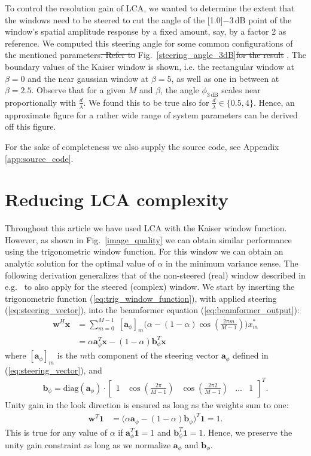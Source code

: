 \documentclass[10pt,journal,draftclsnofoot,onecolumn]{IEEEtran}
\newcommand\Fig[1]{Fig.~\ref{#1}}
\newcommand\nn{\nonumber\\}
\newcommand\sumb[2]{\sum\limits_{#1}^{#2}\;}
\newcommand\T{^{\scriptscriptstyle T}}
\renewcommand\H{^{\scriptscriptstyle H}}
\renewcommand\vec[1]{\boldsymbol{#1}}
\newcommand\1{\vec 1}
\renewcommand*\a{\vec a}
\newcommand*\w{\vec w}
\newcommand*\x{\vec x}
\newcommand\minus{\scalebox{0.75}[1.0]{$-$}}
\providecommand{\DIFadd}[1]{{\protect\color{blue}\uwave{#1}}} %
\providecommand{\DIFdel}[1]{{\protect\color{red}\sout{#1}}}                      %
\providecommand{\DIFaddbegin}{} %
\providecommand{\DIFaddend}{} %
\providecommand{\DIFdelbegin}{} %
\providecommand{\DIFdelend}{} %
\begin{document}
To control the resolution gain of LCA, we wanted to determine the extent that the windows need to be steered to cut the angle of the \minus{}3\,dB point of the window's spatial amplitude response by a fixed amount, say, by a factor 2 as reference. We computed this steering angle for some common configurations of the mentioned parameters\DIFdelbegin \DIFdel{. Refer to }\DIFdelend \DIFaddbegin \DIFadd{, see the result in }\DIFaddend \Fig{steering_angle_3dB}\DIFdelbegin \DIFdel{for the result }\DIFdelend . The boundary values of the Kaiser window is shown, i.e. the rectangular window at $\beta=0$ and the near gaussian window at $\beta=5$, as well as one in between at $\beta=2.5$. Observe that for a given $M$ and $\beta$, the angle $\phi_\mathrm{3\,dB}$ scales near proportionally with $\frac{d}{\lambda}$. We found this to be true also for $\frac{d}{\lambda}\in\{0.5,4\}$. Hence, an approximate figure for a rather wide range of system parameters can be derived off this figure.

For the sake of completeness we also supply the source code, see Appendix \ref{app:source_code}.


\section{Reducing LCA complexity}\label{sec:reducing_lca_complexity}

\renewcommand\b{\vec b}

Throughout this article we have used LCA with the Kaiser window function. However, as shown in \Fig{image_quality} we can obtain similar performance using the trigonometric window function. For this window we can obtain an analytic solution for the optimal value of $\alpha$ in the minimum variance sense. The following derivation generalizes that of the non-steered (real) window described in e.g.~\cite{Stoica2005} to also apply for the steered (complex) window. We start by inserting the trigonometric function (\ref{eq:trig_window_function}), with applied steering (\ref{eq:steering_vector}), into the beamformer equation (\ref{eq:beamformer_output}):
%
\begin{align}
\w\H\x &= \sumb{m=0}{M-1} [\a_\phi]_m\Big(\alpha - (1-\alpha)\cos\left(\frac{2\pi m}{M-1}\right)\Big) x_m^* \nn
&= \alpha \a_\phi\T\x - (1-\alpha)\b_\phi\T\x
\end{align}
%
where $[\a_\phi]_m$ is the $m$th component of the steering vector $\a_\phi$ defined in (\ref{eq:steering_vector}), and 
%
\begin{align}
\b_\phi = \text{diag}(\a_\phi)\cdot\begin{bmatrix}
     1 &
     \cos\left(\frac{2\pi}{M-1}\right) &
     \cos\left(\frac{2\pi 2}{M-1}\right) &
     \hdots &
     1
     \end{bmatrix}\T.
\end{align}
%
Unity gain in the look direction is ensured as long as the weights sum to one:
%
\begin{align}
\w\T\1 &= \big(\alpha\a_\phi - (1-\alpha)\b_\phi\big)\T\1 = 1.
\end{align}
%
This is true for any value of $\alpha$ if $\a_\phi\T\1 = 1$ and $\b_\phi\T\1 = 1$. Hence, we  preserve the unity gain constraint as long as we normalize $\a_\phi$ and $\b_\phi$.
\end{document}
